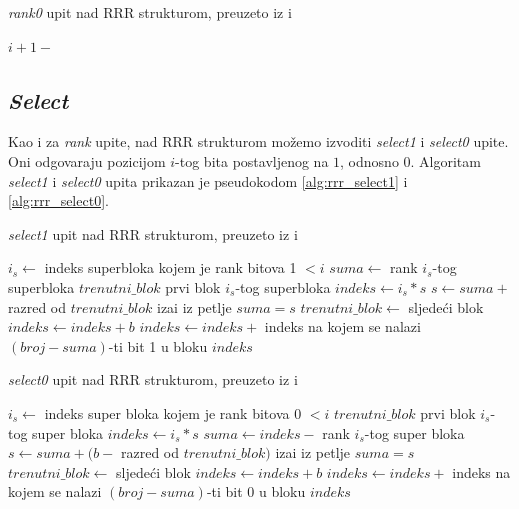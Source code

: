 \begin{algorithm}[H]
  \caption{\emph{rank0} upit nad RRR strukturom, preuzeto iz \cite{bowe-th} i \cite{breberic}}
  \begin{algorithmic}[1]
      \State{} \Return $i + 1 - $ 
    \EndFunction
  \end{algorithmic}
  \label{alg:rrr_rank0}
\end{algorithm}


\subsection{\emph{Select}}

Kao i za \emph{rank} upite, nad RRR strukturom možemo izvoditi \emph{select1} i \emph{select0} upite. Oni odgovaraju pozicijom $i$-tog bita postavljenog na $1$, odnosno $0$. Algoritam \emph{select1} i \emph{select0} upita prikazan je pseudokodom \ref{alg:rrr_select1} i \ref{alg:rrr_select0}.

\begin{algorithm}[H]
  \caption{\emph{select1} upit nad RRR strukturom, preuzeto iz \cite{bowe-th} i \cite{breberic}}
  \begin{algorithmic}[1]
    \State $i_s \gets$ indeks superbloka kojem je rank bitova 1 $ < i$
    \State $suma \gets $ rank $i_s$-tog superbloka
    \State $trenutni\_blok$ prvi blok $i_s$-tog superbloka
    \State $indeks \gets i_s * s$
      \State $s \gets suma + $ razred od $trenutni\_blok$
        \State iza\dj{}i iz petlje
      \Else
        \State $suma = s$
      \EndIf
      \State $trenutni\_blok \gets $ sljede\'{c}i blok
      \State $indeks \gets indeks + b$
    \EndWhile
    \State $indeks \gets indeks + $ indeks na kojem se nalazi $(broj-suma)$-ti bit 1 u bloku
    \State{} \Return $indeks$
    \EndFunction
  \end{algorithmic}
  \label{alg:rrr_select1}
\end{algorithm}

\begin{algorithm}[H]
  \caption{\emph{select0} upit nad RRR strukturom, preuzeto iz \cite{bowe-th} i \cite{breberic}}
  \begin{algorithmic}[1]
    \State $i_s \gets$ indeks super bloka kojem je rank bitova 0 $ < i$
    \State $trenutni\_blok$ prvi blok $i_s$-tog super bloka
    \State $indeks \gets i_s * s$
    \State $suma \gets indeks - $ rank $i_s$-tog super bloka
      \State $s \gets suma + (b - $ razred od $trenutni\_blok)$
        \State iza\dj{}i iz petlje
      \Else
        \State $suma = s$
      \EndIf
      \State $trenutni\_blok \gets $ sljedeći blok
      \State $indeks \gets indeks + b$
    \EndWhile
    \State $indeks \gets indeks + $ indeks na kojem se nalazi $(broj-suma)$-ti bit 0 u bloku
    \State{} \Return $indeks$
    \EndFunction
  \end{algorithmic}
  \label{alg:rrr_select0}
\end{algorithm}

